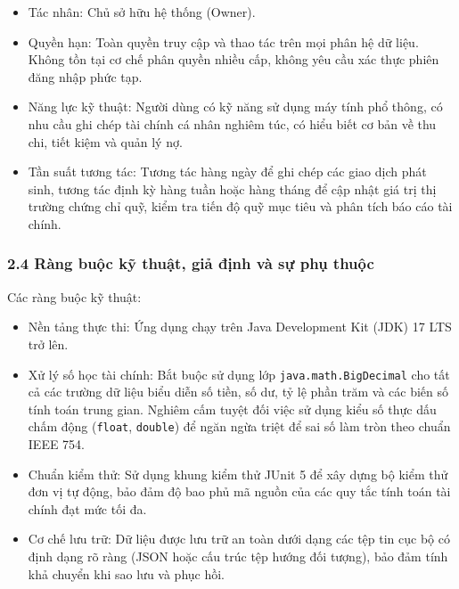 \documentclass[11pt,a4paper]{article}
\providecommand{\tightlist}{
  \setlength{\itemsep}{0pt}\setlength{\parskip}{0pt}}
\begin{document}
\begin{itemize}
\tightlist
\item
  Tác nhân: Chủ sở hữu hệ thống (Owner).
\item
  Quyền hạn: Toàn quyền truy cập và thao tác trên mọi phân hệ dữ liệu.
  Không tồn tại cơ chế phân quyền nhiều cấp, không yêu cầu xác thực
  phiên đăng nhập phức tạp.
\item
  Năng lực kỹ thuật: Người dùng có kỹ năng sử dụng máy tính phổ thông,
  có nhu cầu ghi chép tài chính cá nhân nghiêm túc, có hiểu biết cơ bản
  về thu chi, tiết kiệm và quản lý nợ.
\item
  Tần suất tương tác: Tương tác hàng ngày để ghi chép các giao dịch phát
  sinh, tương tác định kỳ hàng tuần hoặc hàng tháng để cập nhật giá trị
  thị trường chứng chỉ quỹ, kiểm tra tiến độ quỹ mục tiêu và phân tích
  báo cáo tài chính.
\end{itemize}

\newpage

\subsubsection{2.4 Ràng buộc kỹ thuật, giả định và sự phụ
thuộc}\label{24-ruxe0ng-buux1ed9c-kux1ef9-thuux1eadt-giux1ea3-ux111ux1ecbnh-vuxe0-sux1ef1-phux1ee5-thuux1ed9c}

Các ràng buộc kỹ thuật:

\begin{itemize}
\tightlist
\item
  Nền tảng thực thi: Ứng dụng chạy trên Java Development Kit (JDK) 17
  LTS trở lên.
\item
  Xử lý số học tài chính: Bắt buộc sử dụng lớp
  \texttt{java.math.BigDecimal} cho tất cả các trường dữ liệu biểu diễn
  số tiền, số dư, tỷ lệ phần trăm và các biến số tính toán trung gian.
  Nghiêm cấm tuyệt đối việc sử dụng kiểu số thực dấu chấm động
  (\texttt{float}, \texttt{double}) để ngăn ngừa triệt để sai số làm
  tròn theo chuẩn IEEE 754.
\item
  Chuẩn kiểm thử: Sử dụng khung kiểm thử JUnit 5 để xây dựng bộ kiểm thử
  đơn vị tự động, bảo đảm độ bao phủ mã nguồn của các quy tắc tính toán
  tài chính đạt mức tối đa.
\item
  Cơ chế lưu trữ: Dữ liệu được lưu trữ an toàn dưới dạng các tệp tin cục
  bộ có định dạng rõ ràng (JSON hoặc cấu trúc tệp hướng đối tượng), bảo
  đảm tính khả chuyển khi sao lưu và phục hồi.
\end{itemize}
\end{document}
